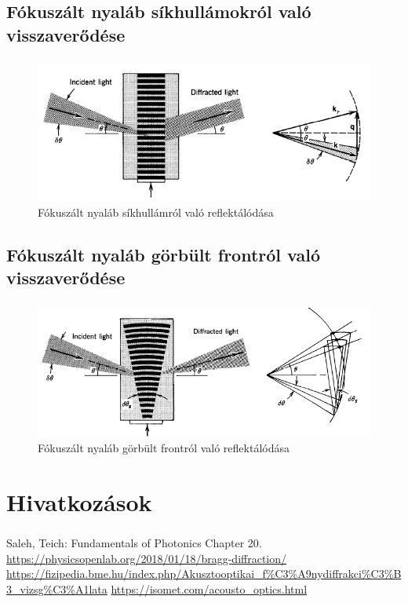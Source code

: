 \documentclass[aspectratio=169]{beamer}
\begin{document}
\subsection{Fókuszált nyaláb síkhullámokról való visszaverődése}
\begin{frame}
\frametitle{\subsecname}
\begin{figure}
\includegraphics[width=.85\textwidth]{beam-planar.png}
\caption{Fókuszált nyaláb síkhullámról való reflektálódása}
\end{figure}
\end{frame}
\subsection{Fókuszált nyaláb görbült frontról való visszaverődése}
\begin{frame}
\frametitle{\subsecname}
\begin{figure}
\includegraphics[width=.85\textwidth]{beam-spherical.png}
\caption{Fókuszált nyaláb görbült frontról való reflektálódása}
\end{figure}
\end{frame}

\section{Hivatkozások}
\begin{frame}
\frametitle{\secname}
\begin{thebibliography}{99}
\footnotesize
{} Saleh, Teich: Fundamentals of Photonics Chapter 20.
 \url{https://physicsopenlab.org/2018/01/18/bragg-diffraction/}
 \url{https://fizipedia.bme.hu/index.php/Akusztooptikai_f\%C3\%A9nydiffrakci\%C3\%B3_vizsg\%C3\%A1lata}
 \url{https://isomet.com/acousto_optics.html}
\end{thebibliography}
\end{frame}
\end{document}
